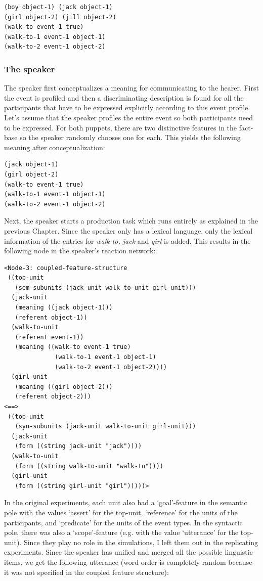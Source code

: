 \ea
\begin{lstlisting}
(boy object-1) (jack object-1)
(girl object-2) (jill object-2)
(walk-to event-1 true)
(walk-to-1 event-1 object-1)
(walk-to-2 event-1 object-2)
\end{lstlisting}
\z

\subsubsection{The speaker}
 The speaker first conceptualizes a meaning for communicating to the hearer. First the event is profiled and then a discriminating description is found for all the participants that have to be expressed explicitly according to this event profile. Let's assume that the speaker profiles the entire event so both participants need to be expressed. For both puppets, there are two distinctive features in the fact-base so the speaker randomly chooses one for each. This yields the following meaning after conceptualization:

\ea
\begin{lstlisting}
(jack object-1)
(girl object-2)
(walk-to event-1 true)
(walk-to-1 event-1 object-1)
(walk-to-2 event-1 object-2)
\end{lstlisting}
\z

Next, the speaker starts a production task which runs entirely as explained in the previous Chapter. Since the speaker only has a lexical language, only the lexical information of the entries for {\em walk-to, jack} and {\em girl} is added. This results in the following node in the speaker's reaction network:

\ea
\begin{lstlisting}
<Node-3: coupled-feature-structure
 ((top-unit
   (sem-subunits (jack-unit walk-to-unit girl-unit)))
  (jack-unit
   (meaning ((jack object-1)))
   (referent object-1))
  (walk-to-unit
   (referent event-1))
   (meaning ((walk-to event-1 true)
              (walk-to-1 event-1 object-1)
              (walk-to-2 event-1 object-2))))
  (girl-unit
   (meaning ((girl object-2)))
   (referent object-2)))
<==>
 ((top-unit
   (syn-subunits (jack-unit walk-to-unit girl-unit)))
  (jack-unit
   (form ((string jack-unit "jack"))))
  (walk-to-unit
   (form ((string walk-to-unit "walk-to"))))
  (girl-unit
   (form ((string girl-unit "girl")))))>
\end{lstlisting}
\z

In the original experiments, each unit also had a `goal'-feature in the semantic pole with the values `assert' for the top-unit, `reference' for the units of the participants, and `predicate' for the units of the event types. In the syntactic pole, there was also a `scope'-feature (e.g. with the value `utterance' for the top-unit). Since they play no role in the simulations, I left them out in the replicating experiments. Since the speaker has unified and merged all the possible linguistic items, we get the following utterance (word order is completely random because it was not specified in the coupled feature structure):

